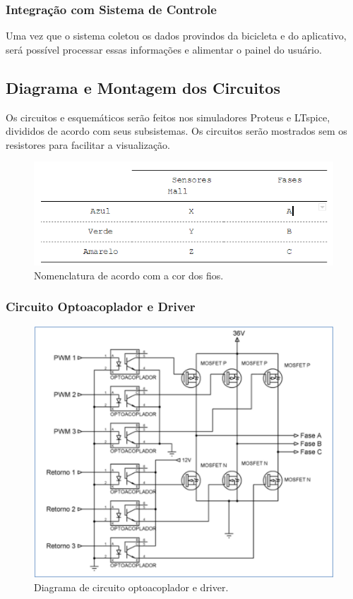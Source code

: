 		\subsubsection{Integração com Sistema de Controle}
		Uma vez que o sistema coletou os dados provindos da bicicleta e do aplicativo, será possível processar essas informações e alimentar o painel do usuário.


	\subsection{Diagrama e Montagem dos Circuitos}
	Os circuitos e esquemáticos serão feitos nos simuladores Proteus e LTspice, divididos de acordo com seus subsistemas. Os circuitos serão mostrados sem os resistores para facilitar a visualização.
	\newpage
	
		\graphicspath{{figuras/}}
		\begin{figure}[h!]
			\centering
			\includegraphics[scale=0.80]{Tabela_1_cor_dos_fios.png}
			\caption{Nomenclatura de acordo com a cor dos fios.}
			\label{img:Nomenclatura_de_acordo_com_a_cor_dos_fios}
		\end{figure}
		
		\subsubsection{Circuito Optoacoplador e Driver}
		
			\graphicspath{{figuras/}}
			\begin{figure}[h!]
				\centering
				\includegraphics[scale=0.80]{Figura12_circuito_optoacoplador_e_driver.PNG}
				\caption{Diagrama de circuito optoacoplador e driver.}
				\label{img:Diagrama_do_circuito_optoacoplador_e_driver}
			\end{figure}
		
